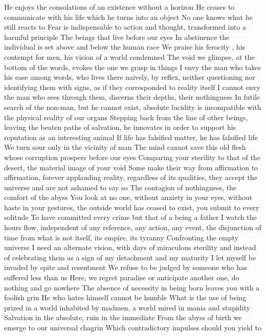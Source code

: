\documentclass{article}
\begin{document}
He enjoys the consolations of an existence without a horizon
He ceases to communicate with his life which he turns into an object
No one knows what he still reacts to
Fear is indispensable  to action and thought, transformed into a harmful principle
The beings that live before our eyes
In abstinence the individual is set above and below the human race
We praise his ferocity , his contempt for men, his vision of a world condemned
The void we glimpse, at the bottom of the words, evokes the one we grasp in things
I envy the man who takes his ease among words, who lives there naively, by reflex, neither questioning nor identifying them with signs, as if they corresponded to reality itself
I cannot envy the man who sees through them, discerns their depths, their nothingness
In futile search of the non-man, but he cannot exist, absolute lucidity is incompatible with the physical reality of our organs
Stepping back from the line of other beings, leaving the beaten paths of salvation, he innovates in order to support his reputation as an interesting animal
If life has falsified matter, he has falsified life
We turn sour only in the vicinity of man
The mind cannot save this old flesh whose corruption prospers before our eyes
Comparing your sterility to that of the desert, the material image of your void
Some make their way from affirmation to affirmation, forever applauding reality, regardless of its qualities, they accept the universe and are not ashamed to say so
The contagion of nothingness, the comfort of the abyss
You look at no one, without anxiety in your eyes, without haste in your gestures, the outside world has ceased to exist, you submit to every solitude
To have committed every crime but that of a being a father
I watch the hours flow, independent of any reference, any action, any event, the disjunction of time from what is not itself, its empire, its tyranny
Confronting the empty universe
I need an alternate vision, with days of miraculous sterility and instead of celebrating them as a sign of my detachment and my maturity
I let myself be invaded by spite and resentment
We refuse to be judged by someone who has suffered less than us
Here, we regret paradise or anticipate another one, do nothing and go nowhere
The absence of necessity in being born leaves you with a foolish grin
He who hates himself cannot be humble
What is the use of being prized in a world inhabited by madmen, a world mired in mania and stupidity
Salvation in the absolute, ruin in the immediate
From the abyss of birth we emerge to our universal chagrin
Which contradictory impulses should you yield to
\end{document}
